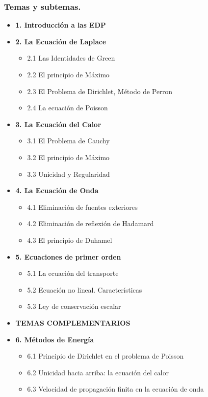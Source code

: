 \documentclass[10pt,a4paper]{article}
\begin{document}
\subsubsection{Temas y subtemas.}
\begin{itemize}
    \item \textbf{1. Introducción a las EDP}

    \item \textbf{2. La Ecuación de Laplace}
    \begin{itemize}
        \item 2.1 Las Identidades de Green
        \item 2.2 El principio de Máximo
        \item 2.3 El Problema de Dirichlet, Método de Perron
        \item 2.4 La ecuación de Poisson
    \end{itemize}

    \item \textbf{3. La Ecuación del Calor}
    \begin{itemize}
        \item 3.1 El Problema de Cauchy
        \item 3.2 El principio de Máximo
        \item 3.3 Unicidad y Regularidad
    \end{itemize}

    \item \textbf{4. La Ecuación de Onda}
    \begin{itemize}
        \item 4.1 Eliminación de fuentes exteriores
        \item 4.2 Eliminación de reflexión de Hadamard
        \item 4.3 El principio de Duhamel
    \end{itemize}

    \item \textbf{5. Ecuaciones de primer orden}
    \begin{itemize}
        \item 5.1 La ecuación del transporte
        \item 5.2 Ecuación no lineal. Características
        \item 5.3 Ley de conservación escalar
    \end{itemize}

    \item \textbf{TEMAS COMPLEMENTARIOS}

    \item \textbf{6. Métodos de Energía}
    \begin{itemize}
        \item 6.1 Principio de Dirichlet en el problema de Poisson
        \item 6.2 Unicidad hacia arriba: la ecuación del calor
        \item 6.3 Velocidad de propagación finita en la ecuación de onda
    \end{itemize}


\end{itemize}
\end{document}
